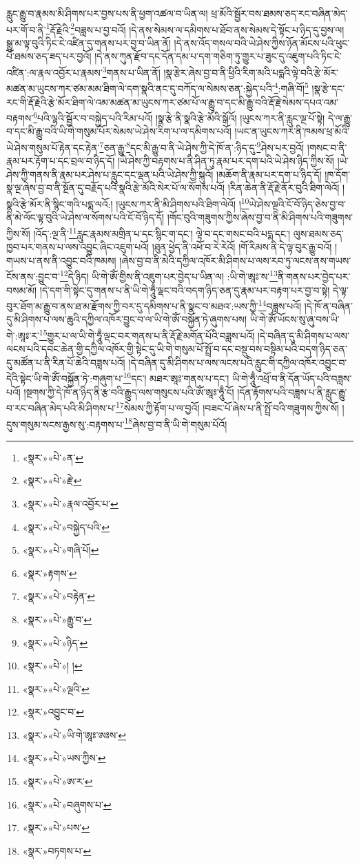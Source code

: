 རླུང་རྒྱུ་བ་རྣམས་མི་ཤིགས་པར་བྱས་པས་ནི་ཕྱག་འཚལ་བ་ཡིན་ལ། ཕྲ་མོའི་སྦྱོར་བས་ཐམས་ཅད་རང་བཞིན་མེད་པར་གོ་བ་ནི་\footnote{«སྣར་»«པེ་»ན་}རྡོ་རྗེའི་\footnote{«སྣར་»«པེ་»རྗེ་}བཟླས་པ་བྱ་བའོ། །དེ་ནས་སེམས་ལ་དམིགས་པ་ཐོབ་ནས་སེམས་དེ་སྟོང་པ་ཉིད་དུ་བྱས་ལ། སྒྱུ་མ་ལྟ་བུའི་ཏིང་ངེ་འཛིན་དུ་གནས་པར་བྱ་བ་ཡིན་ནོ། །དེ་ནས་འོད་གསལ་བའི་ཡེ་ཤེས་ཀྱིས་ཉོན་མོངས་པའི་ཕུང་པོ་ཐམས་ཅད་ཟད་པར་བྱའོ། །དེ་ནས་ཀུན་རྫོབ་དང་དོན་དམ་པ་དག་གཅིག་ཏུ་གྱུར་པ་ཟུང་དུ་འཇུག་པའི་ཏིང་ངེ་འཛིན་:ལ་རྣལ་འབྱོར་པ་རྣམས་\footnote{«སྣར་»«པེ་»རྣལ་འབྱོར་པ་}གནས་པ་ཡིན་ནོ། །སྣ་རྩེར་ཞེས་བྱ་བ་ནི་ཕྱིའི་རིག་མའི་པདྨའི་ལྟེ་བའི་རྩེ་མོར་མཚན་མ་ཡུངས་ཀར་ཙམ་མམ་ཐིག་ལེ་དག་སྣའི་ནང་དུ་བཀོད་ལ་སེམས་ཅན་:སྐྱེད་པའི་\footnote{«སྣར་»«པེ་»བསྐྱེད་པའི་}:གཞི་བོ།\footnote{«སྣར་»«པེ་»གཞི་པོ།} །སྣ་རྩེ་དང་རང་གི་རྡོ་རྗེའི་རྩེ་མོར་ཐིག་ལེ་འམ་མཚན་མ་ཡུངས་ཀར་ཙམ་པོ་ལ་རྒྱུ་བ་དང་མི་རྒྱུ་བའི་རྡོ་རྗེ་སེམས་དཔའ་འམ་བརྟགས་\footnote{«སྣར་»རྟགས་}པའི་ལྷའི་སྦྱོར་བ་བསྐྱེད་པའི་རིམ་པའོ། །སྣ་རྩེ་ནི་སྣའི་རྩེ་མོའི་སྒོའོ། །ཡུངས་ཀར་ནི་རླུང་ལྔ་པོ་སྟེ། དེ་ལ་རྒྱུ་བ་དང་མི་རྒྱུ་བའི་ཡི་གེ་གསུམ་པོར་སེམས་ཡེ་ཤེས་རིག་པ་ལ་དམིགས་པའོ། །ཡང་ན་ཡུངས་ཀར་ནི་ཁམས་ཕྲ་མོའི་ཡེ་ཤེས་གསུམ་པོ་རྟེན་དང་རྟེན་\footnote{«སྣར་»«པེ་»བརྟེན་}ཅན་རྒྱུ་\footnote{«སྣར་»«པེ་»རྒྱུ་བ་}དང་མི་རྒྱུ་བ་ནི་ཡེ་ཤེས་ཀྱི་དེ་ཁོ་ན་:ཉིད་དུ་\footnote{«སྣར་»«པེ་»ཉིད་}ཤེས་པར་བྱའོ། །གསང་བ་ནི་རྣམ་པར་རྟོག་པ་དང་བྲལ་བ་ཉིད་དོ། །ཡེ་ཤེས་ཀྱི་བརྟགས་པ་ནི་ཤིན་ཏུ་རྣམ་པར་དག་པའི་ཡེ་ཤེས་ཉིད་ཀྱིས་སོ། །ཡེ་ཤེས་ཀྱི་གནས་ནི་རྣམ་པར་ཤེས་པ་རླུང་དང་ལྡན་པའི་ཡེ་ཤེས་ཀྱི་སྐུའོ། །མཆོག་ནི་རྣམ་པར་དག་པ་ཉིད་དོ། །ཁ་དོག་སྣ་ལྔ་ཞེས་བྱ་བ་ནི་སྔོན་དུ་བརྗོད་པའི་སྣའི་རྩེ་མོའི་སེར་པོ་ལ་སོགས་པའོ། །རིན་ཆེན་ནི་རྡོ་རྗེ་ནོར་བུའི་ཐིག་ལེའོ། །སྣའི་རྩེ་མོར་ནི་སྙིང་གའི་པདྨ་ལའོ:། །ཡུངས་ཀར་ནི་མི་ཤིགས་པའི་ཐིག་ལེའོ། །\footnote{«སྣར་»«པེ་»། །}ཡེ་ཤེས་ལྔའི་ངོ་བོ་ཉིད་ཅེས་བྱ་བ་ནི་མེ་ལོང་ལྟ་བུའི་ཡེ་ཤེས་ལ་སོགས་པའི་ངོ་བོ་ཉིད་དོ། །གོང་བུའི་གཟུགས་ཀྱིས་ཞེས་བྱ་བ་ནི་མི་ཤིགས་པའི་གཟུགས་ཀྱིས་སོ། །འོད་:ལྔ་ནི་\footnote{«སྣར་»«པེ་»ལྔའི་}རླུང་རྣམས་མགྲིན་པ་དང་སྙིང་ག་དང་། ལྟེ་བ་དང་གསང་བའི་པདྨ་དང་། ལུས་ཐམས་ཅད་ཁྱབ་པར་གནས་པ་ལས་འབྱུང་ཞིང་འཇུག་པའོ། །ཐུན་ཕྱེད་ནི་འཕོ་བ་རེ་རེའོ། །གོ་རིམས་ནི་དེ་ལྟ་བུར་རྒྱུ་བའོ། །གཡས་པ་ནས་ནི་འབྱུང་བའི་ཁམས། །ཞེས་བྱ་བ་ནི་མེའི་དཀྱིལ་འཁོར་མི་ཤིགས་པ་ལས་རབ་ཏུ་ལངས་ནས་གཡས་ངོས་ནས་:བྱུང་བ་\footnote{«སྣར་»འབྱུང་བ་}དེ་ཉིད། ཡི་གེ་ཨོཾ་གྱིས་ནི་འཇུག་པར་བྱེད་པ་ཡིན་ལ། :ཡི་གེ་ཨཱཿ་ས་\footnote{«སྣར་»«པེ་»ཡི་གེ་ཨཱཿ་ཨཿས་}ནི་གནས་པར་བྱེད་པར་བསམ་མོ། །དེ་དག་གི་སྟེང་དུ་གནས་པ་ནི་ཡི་གེ་ཧཱུྃ་ལྡང་བའི་བདག་ཉིད་ཅན་དུ་རྣམ་པར་བརྟག་པར་བྱ་བ་སྟེ། དེ་ལྟ་བུར་ཐོག་མ་རྒྱུ་བ་ནས་ཐ་མ་རྫོགས་ཀྱི་བར་དུ་དམིགས་པ་ནི་སྣང་བ་མཐའ་:ཡས་ཀྱི་\footnote{«སྣར་»«པེ་»ཡས་ཀྱིས་}བཟླས་པའོ། །དེ་ཁོ་ན་བཞིན་དུ་མི་ཤིགས་པ་ལས་ཆུའི་དཀྱིལ་འཁོར་བྱུང་བ་ལ་ཡི་གེ་ཨོཾ་བསྐྱོན་ཏེ་ཞུགས་པས། ཡི་གེ་ཨོཾ་ཡོངས་སུ་ཞུ་བས་ཡི་གེ་:ཨཱཿ་ར་\footnote{«སྣར་»«པེ་»ཨ་ར་}གྱུར་པ་ལ་ཡི་གེ་ཧཱུྃ་ལྡང་བར་གནས་པ་ནི་རྡོ་རྗེ་མགོན་པོའི་བཟླས་པའོ། །དེ་བཞིན་དུ་མི་ཤིགས་པ་ལས་ལངས་པའི་དབང་ཆེན་གྱི་དཀྱིལ་འཁོར་གྱི་སྟེང་དུ་ཡི་གེ་གསུམ་པོ་སྤྲོ་བ་དང་བསྡུ་བས་བསྟིམ་པའི་བདག་ཉིད་ཅན་དུ་མཚོན་པ་ནི་རིན་པོ་ཆེའི་བཟླས་པའོ། །དེ་བཞིན་དུ་མི་ཤིགས་པ་ལས་ལངས་པའི་རླུང་གི་དཀྱིལ་འཁོར་འབྱུང་བ་དེའི་སྟེང་ཡི་གེ་ཨོཾ་བསྐྱོན་ཏེ་:གཞུག་པ་\footnote{«སྣར་»«པེ་»བཞུགས་པ་}དང་། མཐར་ཨཱཿ་གནས་པ་དང་། ཡི་གེ་ཧཱུྃ་འཕྲོ་བ་ནི་དོན་ཡོད་པའི་བཟླས་པའོ། །སྔགས་ཀྱི་དེ་ཁོ་ན་ཉིད་ནི་རྩ་བའི་རྒྱུད་ལས་གསུངས་པའི་ཨོཾ་ཨཱཿ་ཧཱུྃ་ངོ། །དོན་རྟོགས་པའི་བཟླས་པ་ནི་རླུང་རྒྱུ་བ་རང་བཞིན་མེད་པའི་མི་ཤིགས་པ་\footnote{«སྣར་»«པེ་»པས་}སེམས་ཀྱི་རྟོག་པ་ལ་བྱའོ། །བཟང་པོ་ཞེས་པ་ནི་སྤྲོ་བའི་གཟུགས་ཀྱིས་སོ། །དུས་གསུམ་སངས་རྒྱས་སུ་:བརྟགས་པ་\footnote{«སྣར་»བཏགས་པ་}ཞེས་བྱ་བ་ནི་ཡི་གེ་གསུམ་པོའོ། 